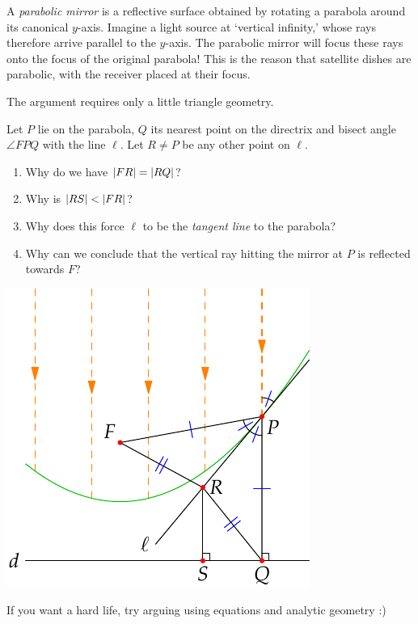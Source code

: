 \begin{tcolorbox}[exercisestyle,title={Why call it the \emph{focus}?}\quad]
A \emph{parabolic mirror} is a reflective surface obtained by rotating a parabola around its canonical $y$-axis. Imagine a light source at `vertical infinity,' whose rays therefore arrive parallel to the $y$-axis. The parabolic mirror will focus these rays onto the focus of the original parabola! This is the reason that satellite dishes are parabolic, with the receiver placed at their focus.\smallbreak

The argument requires only a little triangle geometry.
 
	\begin{minipage}[t]{0.6\linewidth}\vspace{0pt}
	  Let $P$ lie on the parabola, $Q$ its nearest point on the directrix and bisect angle $\angle FPQ$ with the line $\ell$. Let $R\neq P$ be any other point on $\ell$.
	  \begin{enumerate}
	    \item Why do we have $\left| FR\right|=\left| RQ\right|$?
	    \item Why is $\left| RS\right|<\left| FR\right|$?
	    \item Why does this force $\ell$ to be the \emph{tangent line} to the parabola?
	    \item Why can we conclude that the vertical ray hitting the mirror at $P$ is reflected towards $F$?
	  \end{enumerate}
	\end{minipage}\begin{minipage}[t]{0.4\linewidth}\vspace{0pt}
	\flushright\includegraphics{parabola2}
	\end{minipage}
\end{tcolorbox}
If you want a hard life, try arguing using equations and analytic geometry :)\bigbreak

